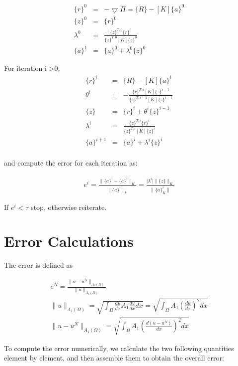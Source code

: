 \documentclass[paper=a4, fontsize=11pt]{article} %
\begin{document}
\begin{eqnarray}
\label{eq: residual}
\{r\}^0 &=& - \bigtriangledown \Pi = \{R\} - [K] \{a\}^0 \nonumber\\
\{z\}^0 &=& \{r\}^0 \nonumber\\
\lambda ^0 &=& \frac{ \{z\}^{T,0} \{r\}^0} { \{z\}^{T,0}[K]\{z\}^0} \nonumber\\
\{a\}^{1} &=& \{a\}^0 + \lambda^0 \{z\}^0
\end{eqnarray}

For iteration i >0, 
\begin{eqnarray}
\{r\}^i &=& \{R\} - [K] \{a\}^i \nonumber\\
\theta^i &=& - \frac{\{r\}^{T,i} [K] \{z\} ^ {i-1}} {\{z\} ^{T,i-1} [K] \{z\}^{i-1} }\nonumber\\
\{z\} &=& \{r\} ^i + \theta ^i \{z\} ^{i-1} \nonumber\\
\lambda ^i &=& \frac{ \{z\}^{T,i} \{r\}^i} { \{z\}^{T,i}[K]\{z\}^i} \nonumber\\
\{a\} ^{i+1} &=& \{a\} ^i + \lambda ^i \{z\} ^i  \nonumber\\
\end{eqnarray}

and compute the error for each iteration as:

\begin{eqnarray}
e^i = \frac{\|\{a\}^i - \{a\}^i \| _K } { \| \{ a\}^i \| _k} = \frac{ \mid \lambda ^i \mid \| \{z\} \| _K }{ \| \{ a\} ^i _K \|} 
\end{eqnarray}

If $e^i < \tau$ stop, otherwise reiterate. 

\section{Error Calculations}
The error is defined as 

\begin{eqnarray}
e^N = \frac{\| u -u^N \| _{A_1(\Omega)}} {\| u \| _{A_1 (\Omega)}} \nonumber\\
\| u \| _{A_1 (\Omega)} = \sqrt{\int_{\Omega} \frac{du}{dx} A_1 \frac{du}{dx} dx} = \sqrt{\int_{\Omega} A_1(\frac{du}{dx})^2 dx}\nonumber\\
\| u -u^N \| _{A_1(\Omega)} = \sqrt{\int_{\Omega} A_1 (\frac{d(u-u^N)}{dx})^2 dx}
\end{eqnarray}

To compute the error numerically, we calculate the two following quantities element by element, and then assemble them to obtain the overall error:
\end{document}
